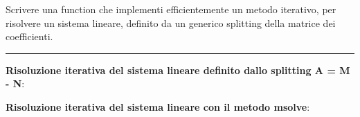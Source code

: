 Scrivere una function che implementi efficientemente un metodo iterativo, per risolvere un sistema lineare,
definito da un generico splitting della matrice dei coefficienti.

\hspace*{\fill}
\par\noindent\rule{\textwidth}{0.4pt}
\hspace*{\fill}

\textbf{Risoluzione iterativa del sistema lineare definito dallo splitting A = M - N}:

\textbf{Risoluzione iterativa del sistema lineare con il metodo msolve}:

